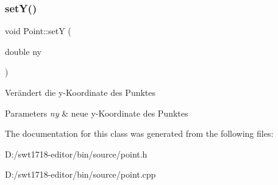 \subsubsection{\texorpdfstring{set\+Y()}{setY()}}
{\footnotesize\ttfamily void Point\+::setY (\begin{DoxyParamCaption}\item[{double}]{ny }\end{DoxyParamCaption})}

Verändert die y-\/\+Koordinate des Punktes 
\begin{DoxyParams}{Parameters}
{\em ny} & neue y-\/\+Koordinate des Punktes \\
\hline
\end{DoxyParams}


The documentation for this class was generated from the following files\+:\begin{DoxyCompactItemize}
\item 
D\+:/swt1718-\/editor/bin/source/point.\+h\item 
D\+:/swt1718-\/editor/bin/source/point.\+cpp\end{DoxyCompactItemize}
